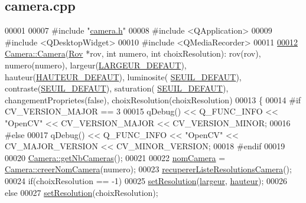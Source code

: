 \hypertarget{camera_8cpp_source}{}\subsection{camera.\+cpp}
\label{camera_8cpp_source}

\begin{DoxyCode}
00001 
00007 \textcolor{preprocessor}{#include "\hyperlink{camera_8h}{camera.h}"}
00008 \textcolor{preprocessor}{#include <QApplication>}
00009 \textcolor{preprocessor}{#include <QDesktopWidget>}
00010 \textcolor{preprocessor}{#include <QMediaRecorder>}
00011 
\hyperlink{class_camera_a26c49f76c98ece6ad6771351dd13583a}{00012} \hyperlink{class_camera_a26c49f76c98ece6ad6771351dd13583a}{Camera::Camera}(\hyperlink{class_rov}{Rov} *rov, \textcolor{keywordtype}{int} numero, \textcolor{keywordtype}{int} choixResolution): rov(rov), numero(numero), 
      largeur(\hyperlink{camera_8h_afe66edd1ec0aa05058aaa2a069248f65}{LARGEUR\_DEFAUT}), hauteur(\hyperlink{camera_8h_a70cf269dc21e5a921c2927034d6cadd2}{HAUTEUR\_DEFAUT}), luminosite(
      \hyperlink{camera_8h_ae340bfbdd3eec3bbbea7d39d91c8aa91}{SEUIL\_DEFAUT}), contraste(\hyperlink{camera_8h_ae340bfbdd3eec3bbbea7d39d91c8aa91}{SEUIL\_DEFAUT}), saturation(
      \hyperlink{camera_8h_ae340bfbdd3eec3bbbea7d39d91c8aa91}{SEUIL\_DEFAUT}), changementProprietes(false), choixResolution(choixResolution)
00013 \{
00014 \textcolor{preprocessor}{    #if CV\_VERSION\_MAJOR == 3}
00015     qDebug() << Q\_FUNC\_INFO << \textcolor{stringliteral}{"OpenCV"} << CV\_VERSION\_MAJOR << CV\_VERSION\_MINOR;
00016 \textcolor{preprocessor}{    #else}
00017     qDebug() << Q\_FUNC\_INFO << \textcolor{stringliteral}{"OpenCV"} << CV\_MAJOR\_VERSION << CV\_MINOR\_VERSION;
00018 \textcolor{preprocessor}{    #endif}
00019 
00020     \hyperlink{class_camera_a116b3869ff0647c851715605a1938a3c}{Camera::getNbCameras}();
00021 
00022     \hyperlink{class_camera_ac1cdaf82921d2a2f3f941d867718eba2}{nomCamera} = \hyperlink{class_camera_a506d459df95042a03894afd5b781c2aa}{Camera::creerNomCamera}(numero);    
00023     \hyperlink{class_camera_a97267488c5756b4217d4e1fbc68008fd}{recupererListeResolutionsCamera}();
00024     \textcolor{keywordflow}{if}(choixResolution == -1)
00025         \hyperlink{class_camera_a966d13a5bf22c776f8d776d3da19182a}{setResolution}(\hyperlink{class_camera_ad64f26cdfc5aa561208b273d430938cf}{largeur}, \hyperlink{class_camera_a5d89d7f9d1a5eab4175dd168c7fbf1c7}{hauteur});
00026     \textcolor{keywordflow}{else}
00027         \hyperlink{class_camera_a966d13a5bf22c776f8d776d3da19182a}{setResolution}(choixResolution);

\end{DoxyCode}
